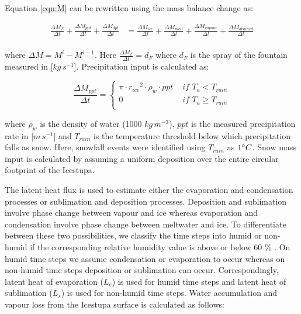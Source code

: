 \documentclass[utf8]{frontiersSCNS} %
\begin{document}
Equation \ref{eqn:M} can be rewritten using the mass balance change as:

\begin{equation} \begin{split} \frac{\Delta M_{F}}{\Delta t} + \frac{\Delta M_{ppt}}{\Delta t} + \frac{\Delta
M_{dpt}}{\Delta t} &=  \frac{\Delta M_{ice}}{\Delta t} + \frac{\Delta M_{melt}}{\Delta t} +  \frac{\Delta
M_{vapour}}{\Delta t} + \frac{\Delta M_{drained}}{\Delta t}\\ \end{split} \label{eqn:mb} \end{equation}

where $\Delta M = M^{i} - M^{i-1}$. Here $\frac{\Delta M_{F}}{\Delta t} = d_F$ where $d_F$ is the spray of the
fountain measured in [$kg\,s^{-1}$].  Precipitation input is calculated as:

\begin{equation} \frac{\Delta M_{ppt}}{\Delta t}  = \left\{ \begin{array}{ll} \pi \cdot {r_{ice}}^2 \cdot
\rho_{w}\cdot ppt& \textit{ if } T_{a} < T_{rain} \\ 0 & \textit{ if } T_{a} \geq T_{rain} \\ \end{array} \right.
    \end{equation}

where $\rho_{w}$ is the density of water (1000 $kg\,m^{-3}$), $ppt$ is the measured precipitation rate in
[$m\,s^{-1}$] and $T_{rain}$ is the temperature threshold below which precipitation falls as snow. Here, snowfall
events were identified using $T_{rain}$ as $1 \degree C$. Snow mass input is calculated by assuming a uniform
deposition over the entire circular footprint of the Icestupa. 

The latent heat flux is used to estimate either the evaporation and condensation processes or sublimation and
deposition processes. Deposition and sublimation involve phase change between vapour and ice whereas evaporation and
condensation involve phase change between meltwater and ice. To differentiate between these two possibilities, we
classify the time steps into humid or non-humid if the corresponding relative humidity value is above or below 60 \%
\citep{Stigter_2018}. On humid time steps we assume condensation or evaporation to occur whereas on non-humid time
steps deposition or sublimation can occur. Correspondingly, latent heat of evaporation ($L_e$) is used for humid time
steps and latent heat of sublimation ($L_s$) is used for non-humid time steps. Water accumulation and vapour loss from
the Icestupa surface is calculated as follows:
\end{document}

